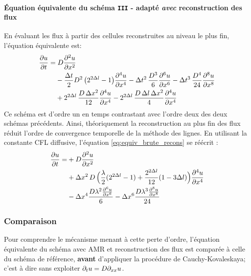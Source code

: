 \paragraph{Équation équivalente du schéma \texttt{III} - adapté \emph{avec} reconstruction des flux}
    En évaluant les flux à partir des cellules reconstruites au niveau le plus fin, l'équation équivalente est:
    \begin{align}\label{eq:equiv_brute_recons}
        \frac{\partial u}{\partial t} =&\; D \frac{\partial^2 u}{\partial x^2} \\\notag
        &- \frac{\Delta t}{2} D^2\, \bigl( 2^{2\Delta l}- 1 \bigr)          \frac{\partial^4 u}{\partial x^4}
        - \Delta t^2\, \frac{D^3}{6}          \frac{\partial^6 u}{\partial x^6}
        - \Delta t^3\, \frac{D^4}{24}         \frac{\partial^8 u}{\partial x^8} \\\notag
        &+ 2^{2\Delta l}\, \frac{D\, \Delta x^2}{12}    \frac{\partial^4 u}{\partial x^4}
        - 2^{2\Delta l}\, \frac{D\, \Delta l\, \Delta x^2}{4} \frac{\partial^4 u}{\partial x^4}
    \end{align}
    Ce schéma est d'ordre un en temps contrastant avec l'ordre deux des deux schémas précédents.
    Ainsi, théoriquement la reconstruction au plus fin des flux réduit l'ordre de convergence temporelle de la méthode des lignes.
    En utilisant la constante CFL diffusive, l'équation \eqref{eq:equiv_brute_recons} se réécrit : 
    \begin{align}\label{eq:equiv_cfl_recons}
        \frac{\partial u}{\partial t}
        =&+ D \frac{\partial^{2}u}{\partial x^{2}}\\\notag
        &+ \Delta x^{2}\, D \, \Bigl( 
        \frac{\lambda}{2} (2^{2 \Delta l} - 1) + \frac{2^{2 \Delta l} }{12} (1 - 3 \Delta l)
        \Bigr)\frac{\partial^{4}u}{\partial x^{4}}\\\notag
        & - \Delta x^{4} \frac{D \lambda^{2} \frac{\partial^{6}u}{\partial x^{6}}}{6} - \Delta x^{6} \frac{D \lambda^{3} \frac{\partial^{8}u}{\partial x^{8}}}{24} 
    \end{align}
\subsubsection{Comparaison}
    Pour comprendre le mécanisme menant à cette perte d'ordre,
    l'équation équivalente du schéma avec AMR et reconstruction des flux est comparée à celle du schéma de référence, 
    \textbf{avant} d'appliquer la procédure de Cauchy-Kovaleskaya; c'est à dire sans exploiter $\partial_t u=D \partial_{xx} u$.
